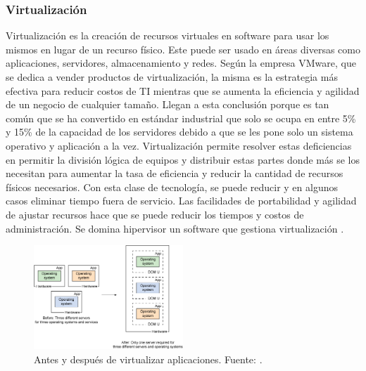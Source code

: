 \subsubsection{Virtualización}
Virtualización es la creación de recursos virtuales en software para usar los mismos en lugar de un recurso físico. Este puede ser usado en áreas diversas como aplicaciones, servidores, almacenamiento y redes. Según la empresa VMware, que se dedica a vender productos de virtualización, la misma es la estrategia más efectiva para reducir costos de TI mientras que se aumenta la eficiencia y agilidad de un negocio de cualquier tamaño. Llegan a esta conclusión porque es tan común que se ha convertido en estándar industrial que solo se ocupa en entre 5\% y 15\% de la capacidad de los servidores debido a que se les pone solo un sistema operativo y aplicación a la vez. Virtualización permite resolver estas deficiencias en permitir la división lógica de equipos y distribuir estas partes donde más se los necesitan para aumentar la tasa de eficiencia y reducir la cantidad de recursos físicos necesarios. Con esta clase de tecnología, se puede reducir y en algunos casos eliminar tiempo fuera de servicio. Las facilidades de portabilidad y agilidad de ajustar recursos hace que se puede reducir los tiempos y costos de administración. Se domina hipervisor un software que gestiona virtualización \citep{VMWare-Virtualization}.

\begin{figure}
  \begin{center}
      \includegraphics[width=0.5\textwidth]{Figures/ibm-virtualization.png}
  \end{center}
  \caption{Antes y después de virtualizar aplicaciones. Fuente: \citep{IBM-Hypervisors}.}
  \label{IBM-Virtualization}
\end{figure}

